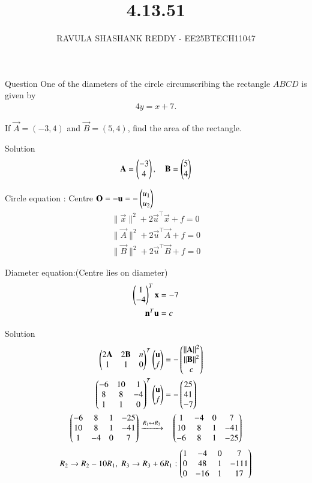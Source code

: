 \documentclass{beamer}
\title %
{4.13.51}
\author %
{RAVULA SHASHANK REDDY - EE25BTECH11047}
\begin{document}
	
	
	\frame{\titlepage}
	\begin{frame}{Question}
One of the diameters of the circle circumscribing the rectangle \(ABCD\) is given by
\begin{align*}
4y = x + 7.
\end{align*}

If \(\vec{A}=(-3,4)\) and \(\vec{B}=(5,4)\), find the area of the rectangle.

\end{frame}
\begin{frame}{Solution}
    \begin{align}
\mathbf{A}=\begin{pmatrix}-3\\4\end{pmatrix},\quad \mathbf{B}=\begin{pmatrix}5\\4\end{pmatrix}
\end{align}

Circle equation : \quad Centre $\mathbf{O}=-\mathbf{u}=-\begin{pmatrix}u_1\\u_2\end{pmatrix}$
\begin{align}
\|\vec{x}\|^2 + 2 \vec{u}^\top \vec{x} + f = 0\\
\|\vec{A}\|^2 + 2 \vec{u}^\top \vec{A} + f = 0\\
\|\vec{B}\|^2 + 2 \vec{u}^\top \vec{B} + f = 0
\end{align}

Diameter equation:(Centre lies on diameter)
\begin{align}
\begin{pmatrix}1 \\ -4\end{pmatrix}^T\mathbf{x}&=-7\\
\mathbf{n}^T\mathbf{u}&=c
\end{align}
\end{frame}
\begin{frame}{Solution}
\begin{align}
\begin{pmatrix}2\mathbf{A} & 2\mathbf{B} & n \\ 1 & 1 & 0\end{pmatrix}^T\begin{pmatrix}\mathbf{u}\\f\end{pmatrix}&=-\begin{pmatrix}||\mathbf{A}||^2\\||\mathbf{B}||^2\\c\end{pmatrix}\\
\begin{pmatrix}-6 & 10 & 1  \\
8 & 8 & -4 \\
1 & 1 & 0 \end{pmatrix}^T\begin{pmatrix}\mathbf{u}\\f\end{pmatrix} &= -\begin{pmatrix}25 \\ 41 \\ -7\end{pmatrix}\\
\begin{pmatrix}
-6 & 8 & 1 & -25 \\
10 & 8 & 1 & -41 \\
1 & -4 & 0 & 7
\end{pmatrix}
\xrightarrow{ R_1 \leftrightarrow R_3} & \quad
\begin{pmatrix}
1 & -4 & 0 & 7 \\
10 & 8 & 1 & -41 \\
-6 & 8 & 1 & -25
\end{pmatrix} 
\end{align}
\begin{align}
R_2 \to R_2 - 10R_1, \; R_3 \to R_3 + 6 R_1 :
 \begin{pmatrix}
1 & -4 & 0 & 7 \\
0 & 48 & 1 & -111 \\
0 & -16 & 1 & 17
\end{pmatrix} 
\end{align}
\end{frame}
\end{document}
